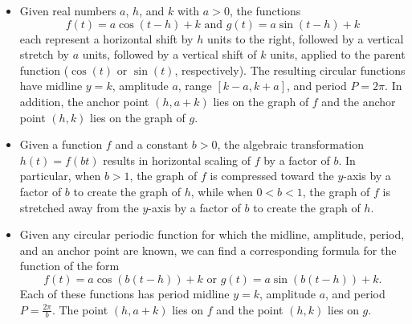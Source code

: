 \documentclass{ximera}
\begin{document}
%
%
%

\begin{summary}
\begin{itemize}[label=\textbullet]
\item
Given real numbers \(a\), \(h\), and \(k\) with \(a > 0\), the functions%
\begin{equation*}
f(t) = a\cos(t-h)+k \text{ and } g(t) = a\sin(t-h) + k
\end{equation*}
each represent a horizontal shift by \(h\) units to the right, followed by a vertical stretch by \(a\) units, followed by a vertical shift of \(k\) units, applied to the parent function (\(\cos(t)\) or \(\sin(t)\), respectively).  The resulting circular functions have midline \(y = k\), amplitude \(a\), range \([k-a,k+a]\), and period \(P = 2\pi\).  In addition, the anchor point \((h,a+k)\) lies on the graph of \(f\) and the anchor point \((h,k)\) lies on the graph of \(g\).%
\item
Given a function \(f\) and a constant \(b > 0\), the algebraic transformation \(h(t) = f(bt)\) results in horizontal scaling of \(f\) by a factor of \(b\).  In particular, when \(b > 1\), the graph of \(f\) is compressed toward the \(y\)-axis by a factor of \(b\) to create the graph of \(h\), while when \(0 < b < 1\), the graph of \(f\) is stretched away from the \(y\)-axis by a factor of \(b\) to create the graph of \(h\).%
\item
Given any circular periodic function for which the midline, amplitude, period, and an anchor point are known, we can find a corresponding formula for the function of the form%
\begin{equation*}
f(t) = a\cos(b(t-h))+k \text{ or } g(t) = a\sin(b(t-h)) + k\text{.}
\end{equation*}
Each of these functions has period midline \(y = k\), amplitude \(a\), and period \(P = \frac{2\pi}{b}\).  The point \((h,a+k)\) lies on \(f\) and the point \((h,k)\) lies on \(g\).%
\end{itemize}
\end{summary}
%
%
\end{document}
